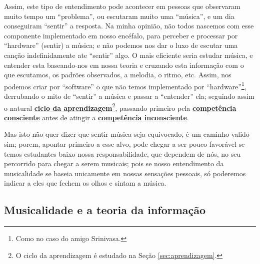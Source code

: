 Assim, este tipo de entendimento  pode acontecer em pessoas que observaram muito tempo um ``problema'', 
ou escutaram muito uma ``música'', 
e um dia conseguiram ``sentir'' a resposta. 
Na minha opinião, 
não todos nascemos com esse componente implementado em nosso encéfalo, para perceber e processar por ``hardware'' (sentir) a música; 
e não podemos nos dar o luxo de escutar uma canção indefinidamente ate ``sentir'' algo. 
O mais eficiente seria estudar música, 
e entender esta baseando-nos em nossa teoria e cruzando esta informação com o que escutamos,
os padrões observados, a melodia, o ritmo, etc. 
Assim, nos podemos criar por ``software'' o que não temos implementado por ``hardware''\footnote{Como no caso do amigo Srinivasa.}, 
derrubando o mito de ``sentir'' a música e passar a ``entender'' ela;
seguindo assim o natural \hyperref[sec:aprendizagem]{\textbf{ciclo da aprendizagem}}\footnote{O
ciclo da aprendizagem é estudado na Seção \ref{sec:aprendizagem}.}, passando primeiro pela 
\hyperref[ref:CompetenciaConsciente]{\textbf{competência consciente}} 
antes de atingir a  \hyperref[ref:CompetenciaInconsciente]{\textbf{competência inconsciente}}.

Mas isto não quer dizer que sentir música seja equivocado, é um caminho valido sim;
porem, apontar primeiro a esse alvo, 
pode chegar a ser pouco favorável se temos estudantes baixo nossa responsabilidade,
 que dependem de nós, no seu percorrido para chegar a serem musicais; 
pois se nosso entendimento da musicalidade se baseia unicamente em nossas sensações pessoais,
só poderemos indicar a eles que fechem os olhos e sintam a música.


\subsection{Musicalidade e a teoria da informação}



